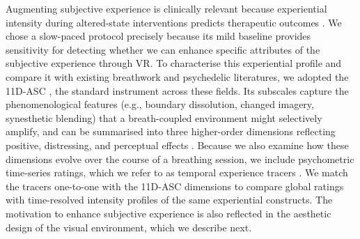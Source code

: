 Augmenting subjective experience is clinically relevant because experiential intensity during altered-state interventions predicts therapeutic outcomes \citep{Roseman2018, DosSantos2025, havenith2025decreased}. We chose a slow-paced protocol precisely because its mild baseline provides sensitivity for detecting whether we can enhance specific attributes of the subjective experience through VR. To characterise this experiential profile and compare it with existing breathwork and psychedelic literatures, we adopted the 11D-ASC \citep{studerus2010, Dittrich1998}, the standard instrument across these fields. Its subscales capture the phenomenological features (e.g., boundary dissolution, changed imagery, synesthetic blending) that a breath-coupled environment might selectively amplify, and can be summarised into three higher-order dimensions reflecting positive, distressing, and perceptual effects \citep{Stocker2025}. Because we also examine how these dimensions evolve over the course of a breathing session, we include psychometric time-series ratings, which we refer to as temporal experience tracers \citep{Jachs2022}. We match the tracers one-to-one with the 11D-ASC dimensions to compare global ratings with time-resolved intensity profiles of the same experiential constructs. The motivation to enhance subjective experience is also reflected in the aesthetic design of the visual environment, which we describe next.


 

